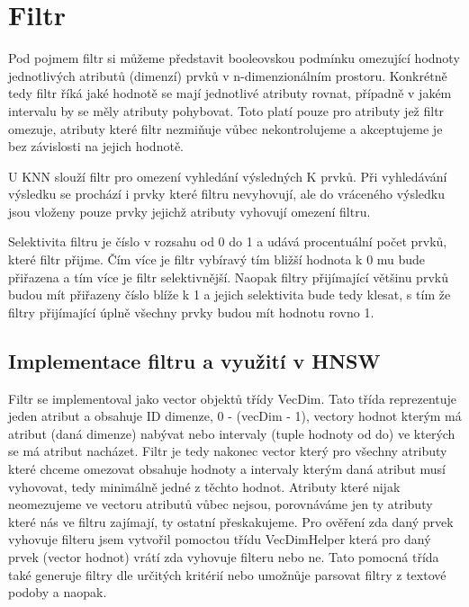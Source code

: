 \documentclass[czech,semestral,dept460,male,csharp,cpdeclaration]{diploma}
\begin{document}
		
	
	\chapter{Filtr}
	
		Pod pojmem filtr si můžeme představit booleovskou podmínku omezující hodnoty jednotlivých atributů (dimenzí) prvků v n-dimenzionálním prostoru. Konkrétně tedy filtr říká jaké hodnotě se mají jednotlivé atributy rovnat, případně v jakém intervalu by se měly atributy pohybovat. Toto platí pouze pro atributy jež filtr omezuje, atributy které filtr nezmiňuje vůbec nekontrolujeme a akceptujeme je bez závislosti na jejich hodnotě.
		
		U KNN slouží filtr pro omezení vyhledání výsledných K prvků. Při vyhledávání výsledku se prochází i prvky které filtru nevyhovují, ale do vráceného výsledku jsou vloženy pouze prvky jejichž atributy vyhovují omezení filtru.
		
		Selektivita filtru je číslo v rozsahu od 0 do 1 a udává procentuální počet prvků, které filtr přijme. Čím více je filtr vybíravý tím bližší hodnota k 0 mu bude přiřazena a tím více je filtr selektivnější. Naopak filtry přijímající většinu prvků budou mít přiřazeny číslo blíže k 1 a jejich selektivita bude tedy klesat, s tím že filtry přijímající úplně všechny prvky budou mít hodnotu rovno 1.
		
		\section{Implementace filtru a využití v HNSW}
		
		Filtr se implementoval jako vector objektů třídy VecDim. Tato třída reprezentuje jeden atribut a obsahuje ID dimenze, 0 - (vecDim - 1), vectory hodnot kterým má atribut (daná dimenze) nabývat nebo intervaly (tuple hodnoty od do) ve kterých se má atribut nacházet. Filtr je tedy nakonec vector který pro všechny atributy které chceme omezovat obsahuje hodnoty a intervaly kterým daná atribut musí vyhovovat, tedy minimálně jedné z těchto hodnot. Atributy které nijak neomezujeme ve vectoru atributů vůbec nejsou, porovnáváme jen ty atributy které nás ve filtru zajímají, ty ostatní přeskakujeme. Pro ověření zda daný prvek vyhovuje filteru jsem vytvořil pomoctou třídu VecDimHelper která pro daný prvek (vector hodnot) vrátí zda vyhovuje filteru nebo ne. Tato pomocná třída také generuje filtry dle určitých kritérií nebo umožnůje parsovat filtry z textové podoby a naopak.
		
\end{document}
